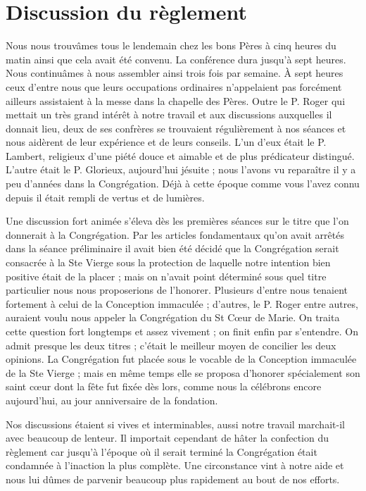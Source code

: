 \section*{Discussion du règlement}
Nous nous trouvâmes tous le lendemain chez les bons Pères à cinq heures du matin ainsi que cela avait été convenu. La conférence dura jusqu'à sept heures. Nous continuâmes à nous assembler ainsi trois fois par semaine. À sept heures ceux d'entre nous que leurs occupations ordinaires n'appelaient pas forcément ailleurs assistaient à la messe dans la chapelle des Pères. Outre le P. Roger qui mettait un très grand intérêt à notre travail et aux discussions auxquelles il donnait lieu, deux de ses confrères
se trouvaient régulièrement à nos séances et nous aidèrent de leur expérience et de leurs conseils. L'un d'eux était le P. Lambert, religieux d'une piété douce et aimable et de plus prédicateur distingué. L'autre était le P. Glorieux, aujourd'hui jésuite ; nous l'avons vu reparaître il y a peu d'années dans la Congrégation. Déjà à cette époque comme vous l'avez connu depuis il était rempli de vertus et de lumières.

Une discussion fort animée s'éleva dès les premières séances sur le titre que l'on donnerait à la Congrégation. Par les articles fondamentaux qu'on avait arrêtés dans la séance préliminaire il avait bien été décidé que la Congrégation serait consacrée à la Ste Vierge sous la protection de laquelle notre intention bien positive était de la placer ; mais on n'avait point déterminé sous quel titre particulier nous nous proposerions de l'honorer. Plusieurs d'entre nous tenaient fortement à celui de la Conception immaculée ; d'autres, le P. Roger entre autres, auraient voulu nous appeler la Congrégation du St Cœur de Marie. On traita cette question fort longtemps et assez vivement ; on finit enfin par s'entendre. On admit presque les deux titres ; c'était le meilleur moyen de concilier les deux opinions. La Congrégation fut placée sous le vocable de la Conception immaculée de la Ste Vierge ; mais en même temps elle se proposa d'honorer spécialement son saint cœur dont la fête fut fixée dès lors, comme nous la célébrons encore aujourd'hui, au jour anniversaire de la fondation.

Nos discussions étaient si vives et interminables, aussi notre travail marchait-il avec beaucoup de lenteur. Il
importait cependant de hâter la confection du règlement car jusqu'à l'époque où il serait terminé la Congrégation était condamnée à l'inaction la plus complète. Une circonstance vint à notre aide et nous lui dûmes de parvenir beaucoup plus rapidement au bout de nos efforts.

